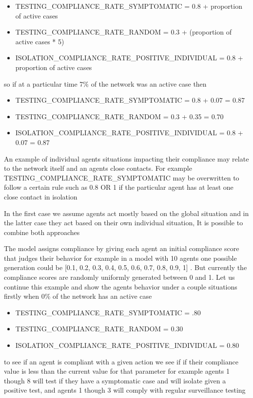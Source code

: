 \documentclass{article}
\begin{document}
\begin{itemize}
\item TESTING\_COMPLIANCE\_RATE\_SYMPTOMATIC = 0.8 + proportion of active cases\
\item TESTING\_COMPLIANCE\_RATE\_RANDOM = 0.3 + (proportion of active cases * 5)\
\item ISOLATION\_COMPLIANCE\_RATE\_POSITIVE\_INDIVIDUAL = 0.8 + proportion of active cases
\end{itemize}

	so if at a particular time 7\% of the network was an active case then 
    
\begin{itemize}
\item TESTING\_COMPLIANCE\_RATE\_SYMPTOMATIC = 0.8 + 0.07 = 0.87\
\item TESTING\_COMPLIANCE\_RATE\_RANDOM = 0.3 + 0.35 = 0.70 \
\item ISOLATION\_COMPLIANCE\_RATE\_POSITIVE\_INDIVIDUAL = 0.8 + 0.07 = 0.87
\end{itemize}


An example of individual agents situations impacting their compliance may relate to the network itself and an agents close contacts.
For example TESTING\_COMPLIANCE\_RATE\_SYMPTOMATIC may be overwritten to follow a certain rule such as 0.8 OR 1 if the particular agent has at least one close contact in isolation 

In the first case we assume agents act mostly based on the global situation and in the latter case they act based on their own individual situation, It is possible to combine both approaches

The model assigns compliance by giving each agent an initial compliance score that judges their behavior for example in a model with 10 agents one possible generation could be [0.1, 0.2, 0.3, 0.4, 0.5, 0.6, 0.7, 0.8, 0.9, 1] . But currently the compliance scores are randomly uniformly generated between 0 and 1. Let us continue this example and show the agents behavior under a couple situations
firstly when 0\% of the network has an active case 

\begin{itemize}
\item TESTING\_COMPLIANCE\_RATE\_SYMPTOMATIC = .80\
\item TESTING\_COMPLIANCE\_RATE\_RANDOM = 0.30 \
\item ISOLATION\_COMPLIANCE\_RATE\_POSITIVE\_INDIVIDUAL = 0.80
\end{itemize}
to see if an agent is compliant with a given action we see if if their compliance value is less than the current value for that parameter for example agents 1 though 8 will test if they have a symptomatic case and will isolate given a positive test, and agents 1 though 3 will comply with regular surveillance testing
\end{document}
